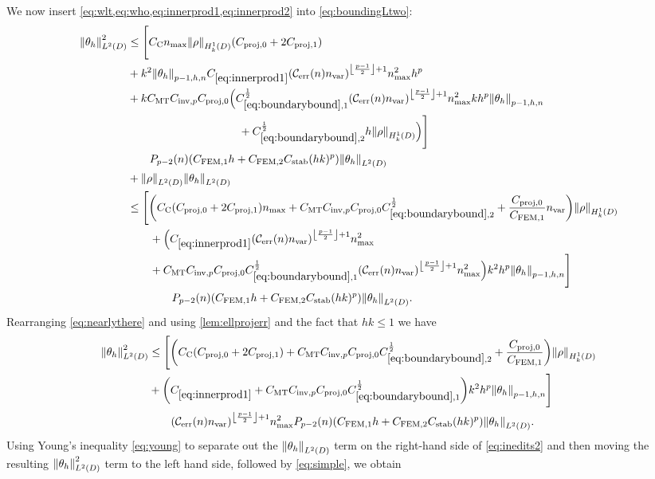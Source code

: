 We now insert \cref{eq:wlt,eq:who,eq:innerprod1,eq:innerprod2} into \cref{eq:boundingLtwo}:
\begin{align}
\NLtD{\thetah}^2 &\leq \Bigg[\Cc\nmax \NHokD{\rho} \mleft(\Cprojfn{0} + 2\Cprojfn{1}\mright)\nonumber\\
&+k^2\Nfn{p-1,h,n}{\thetah}  \Cfourteen \mleft(\En \nvar\mright)^{\floor{\frac{p-1}2}+1}\nmax^2 h^p \nonumber\\
  &+k\CMT \CinvVhp \Cprojfn{0} \Big(\Cboundaryo^{\half} \mleft(\En\nvar\mright)^{\floor{\frac{p-1}2}+1}\nmax^2 k h^{p} \Nfn{p-1,h,n}{\thetah}\nonumber\\
  &\quad\quad\quad\quad\quad\quad\quad\quad\quad\quad+ \Cboundaryt^{\half} h \NHokD{\rho}\Big)\Bigg]\nonumber\\
&\quad\quad \Pfn{p-2}\mleft(n\mright)\mleft(\CFEMotilde h + \CFEMttilde \CAnk (hk)^p\mright)\NLtD{\thetah}\nonumber\\
&+\NLtD{\rho}\NLtD{\thetah}\nonumber\\
&\leq \Bigg[\mleft(\Cc\mleft(\Cprojfn{0} + 2\Cprojfn{1}\mright)\nmax + \CMT \CinvVhp \Cprojfn{0} \Cboundaryt^{\half} + \frac{\Cprojfn{0}}{\CFEMo}\nvar  \mright)\NHokD{\rho} \nonumber\\
  &\quad\quad+\Big(  \Cfourteen \mleft(\En \nvar\mright)^{\floor{\frac{p-1}2}+1}\nmax^2\nonumber\\
  &\quad\quad+ \CMT \CinvVhp \Cprojfn{0}\Cboundaryo^{\half} \mleft(\En\nvar\mright)^{\floor{\frac{p-1}2}+1}\nmax^2\Big)k^2h^p\Nfn{p-1,h,n}{\thetah}\Bigg]\nonumber\\
&\quad\quad\quad\quad \Pfn{p-2}\mleft(n\mright)\mleft(\CFEMotilde h + \CFEMttilde \CAnk (hk)^p\mright)\NLtD{\thetah}.\label{eq:nearlythere}
\end{align}
Rearranging \cref{eq:nearlythere} and using \cref{lem:ellprojerr} and the fact that $hk \leq 1$ we have
  \begin{align}
\NLtD{\thetah}^2&\leq \Bigg[\mleft(\Cc\mleft(\Cprojfn{0} + 2\Cprojfn{1}\mright) + \CMT \CinvVhp \Cprojfn{0} \Cboundaryt^{\half} + \frac{\Cprojfn{0}}{\CFEMo}  \mright)\NHokD{\rho} \nonumber\\
&+\mleft(  \Cfourteen  + \CMT \CinvVhp \Cprojfn{0}\Cboundaryo^{\half} \mright)k^2h^p\Nfn{p-1,h,n}{\thetah}\Bigg]\nonumber\\
&\quad\quad \mleft(\En \nvar\mright)^{\floor{\frac{p-1}2}+1}\nmax^2\Pfn{p-2}\mleft(n\mright)\mleft(\CFEMotilde h + \CFEMttilde \CAnk (hk)^p\mright)\NLtD{\thetah}.\label{eq:inedits2}
\end{align}
  Using Young's inequality \cref{eq:young} to separate out the $\NLtD{\thetah}$ term on the right-hand side of \cref{eq:inedits2} and then moving the resulting $\NLtD{\thetah}^2$ term to the left hand side, followed by \cref{eq:simple}, we obtain

